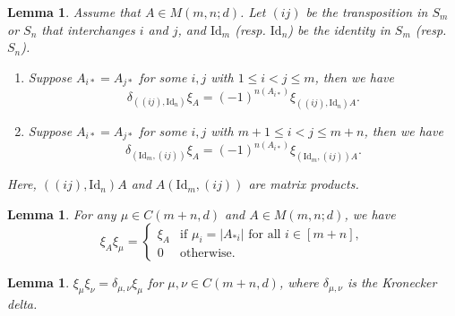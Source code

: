 \documentclass[12pt,reqno]{amsart}
\newtheorem{lemma}[theorem]{Lemma}
\theoremstyle{definition}
\theoremstyle{remark}
\begin{document}
\begin{lemma}\label{multiplicationByTranspositions}
    Assume that $A\in M(m,n;d)$. Let $(ij)$ be the transposition in $S_m$ or $S_n$ that interchanges $i$ and $j$, and $\mathrm{Id}_{m}$ (resp. $\mathrm{Id}_{n}$) be the identity in $S_{m}$ (resp. $S_n$).  
    \begin{enumerate}
        \item Suppose $A_{i*}=A_{j*}$ for some $i,j$ with $1\leq i<j\leq m$, then we have $$\delta_{((ij),\mathrm{Id}_{n})}\xi_{A}=(-1)^{n(A_{i*})}\xi_{((ij),\mathrm{Id}_{n})A}.$$
        \item Suppose $A_{i*}=A_{j*}$ for some $i,j$ with $m+1\leq i<j\leq m+n$, then we have $$\delta_{(\mathrm{Id}_{m},(ij))}\xi_{A}=(-1)^{n(A_{i*})}\xi_{(\mathrm{Id}_{m},(ij))A}.$$
    \end{enumerate}
    Here, $((ij),\mathrm{Id}_{n})A$ and $A(\mathrm{Id}_{m},(ij))$ are matrix products.
\end{lemma}

\begin{lemma}\label{compositionMultiplication}
    For any $\mu\in C(m+n,d)$ and $A\in M(m,n;d)$, we have
        \begin{equation*}
        \xi_{A}\xi_{\mu}=
            \begin{cases}
                \xi_{A} & \text{if $\mu_{i}=|A_{*i}|$ for all $i\in [m+n]$},\\
                0 & \text{otherwise.}
            \end{cases}
        \end{equation*}
\end{lemma}


\begin{lemma}\label{idempotents}{\em \cite[Lemma 5.3]{brundan2003new}} 
$\xi_{\mu}\xi_{\nu}=\delta_{\mu,\nu}\xi_{\mu}$ for $\mu,\nu\in C(m+n,d)$, where $\delta_{\mu,\nu}$ is the Kronecker delta.
\end{lemma}
\end{document}
